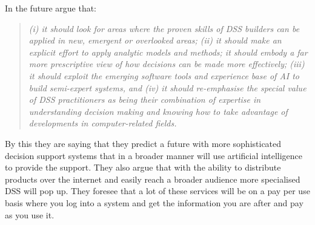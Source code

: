 In the future \cite{shim2002past} argue that:
\begin{quotation}
\textit{(i) it should look for areas where the proven skills of DSS builders can be applied in new, emergent or overlooked areas; (ii) it should make an explicit effort to apply analytic models and methods; it should embody a far more prescriptive view of how decisions can be made more effectively; (iii) it should exploit the emerging software tools and
experience base of AI to build semi-expert systems, and (iv) it should re-emphasise the special value of DSS practitioners as being their combination of expertise in understanding decision making and knowing how to take advantage of developments in computer-related fields.}
\end{quotation}
By this they are saying that they predict a future with more sophisticated decision support systems that in a broader manner will use artificial intelligence to provide the support. They also argue that with the ability to distribute products over the internet and easily reach a broader audience more specialised DSS will pop up. They foresee that a lot of these services will be on a pay per use basis where you log into a system and get the information you are after and pay as you use it.
